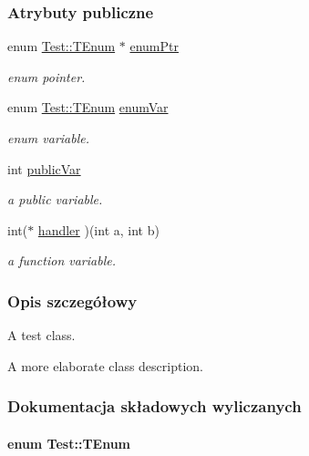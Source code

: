 \subsubsection*{Atrybuty publiczne}
\begin{DoxyCompactItemize}
\item 
enum \hyperlink{classTest_ad8d13fe56b896633273087859b89a1a3}{Test\-::\-T\-Enum} $\ast$ \hyperlink{classTest_add1f72d205230e7bac3fcc70a65c1de2}{enum\-Ptr}
\begin{DoxyCompactList}\small\item\em enum pointer. \end{DoxyCompactList}\item 
enum \hyperlink{classTest_ad8d13fe56b896633273087859b89a1a3}{Test\-::\-T\-Enum} \hyperlink{classTest_a0bd371828a36ad7ea83dfd07b2a672b5}{enum\-Var}
\begin{DoxyCompactList}\small\item\em enum variable. \end{DoxyCompactList}\item 
int \hyperlink{classTest_a3085f973ef857d85d647bf04e89760d0}{public\-Var}
\begin{DoxyCompactList}\small\item\em a public variable. \end{DoxyCompactList}\item 
int($\ast$ \hyperlink{classTest_a8bef142724c4059c18f752e630a4d925}{handler} )(int a, int b)
\begin{DoxyCompactList}\small\item\em a function variable. \end{DoxyCompactList}\end{DoxyCompactItemize}


\subsubsection{Opis szczegółowy}
A test class. 

A more elaborate class description. 

\subsubsection{Dokumentacja składowych wyliczanych}
\hypertarget{classTest_ad8d13fe56b896633273087859b89a1a3}{
\paragraph[{T\-Enum}]{\setlength{\rightskip}{0pt plus 5cm}enum {\bf Test\-::\-T\-Enum}}}\label{classTest_ad8d13fe56b896633273087859b89a1a3}



